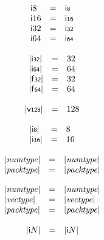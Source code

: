 $$
\begin{array}[t]{@{}lcl@{}l@{}}
{\mathsf{i}}{8} & = & \mathsf{i{\scriptstyle 8}} \\
{\mathsf{i}}{16} & = & \mathsf{i{\scriptstyle 16}} \\
{\mathsf{i}}{32} & = & \mathsf{i{\scriptstyle 32}} \\
{\mathsf{i}}{64} & = & \mathsf{i{\scriptstyle 64}} \\
\end{array}
$$

\vspace{1ex}

$$
\begin{array}[t]{@{}lcl@{}l@{}}
{|\mathsf{i{\scriptstyle 32}}|} & = & 32 \\
{|\mathsf{i{\scriptstyle 64}}|} & = & 64 \\
{|\mathsf{f{\scriptstyle 32}}|} & = & 32 \\
{|\mathsf{f{\scriptstyle 64}}|} & = & 64 \\
\end{array}
$$

$$
\begin{array}[t]{@{}lcl@{}l@{}}
{|\mathsf{v{\scriptstyle 128}}|} & = & 128 \\
\end{array}
$$

$$
\begin{array}[t]{@{}lcl@{}l@{}}
{|\mathsf{i{\scriptstyle 8}}|} & = & 8 \\
{|\mathsf{i{\scriptstyle 16}}|} & = & 16 \\
\end{array}
$$

$$
\begin{array}[t]{@{}lcl@{}l@{}}
{|{\mathit{numtype}}|} & = & {|{\mathit{numtype}}|} \\
{|{\mathit{packtype}}|} & = & {|{\mathit{packtype}}|} \\
\end{array}
$$

$$
\begin{array}[t]{@{}lcl@{}l@{}}
{|{\mathit{numtype}}|} & = & {|{\mathit{numtype}}|} \\
{|{\mathit{vectype}}|} & = & {|{\mathit{vectype}}|} \\
{|{\mathit{packtype}}|} & = & {|{\mathit{packtype}}|} \\
\end{array}
$$

$$
\begin{array}[t]{@{}lcl@{}l@{}}
{|{\mathsf{i}}{N}|} & = & {|{\mathsf{i}}{N}|} \\
\end{array}
$$

